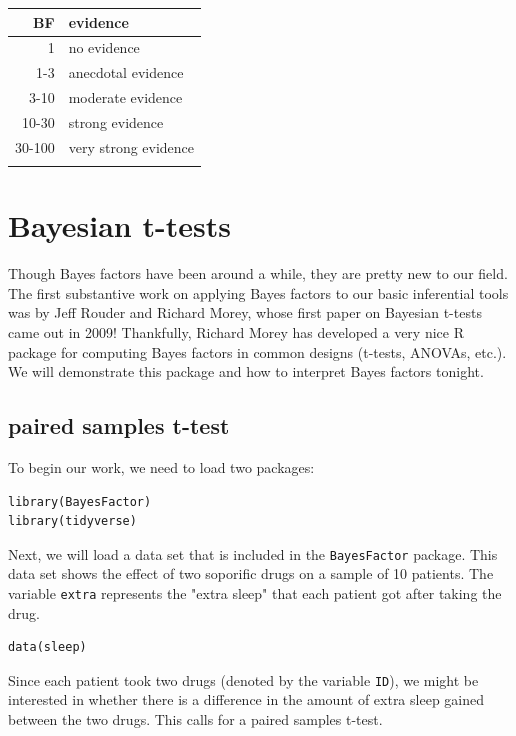 \documentclass[11pt]{article}
\begin{document}
\begin{center}
\begin{tabular}{rl}
BF & evidence\\
\hline
1 & no evidence\\
1-3 & anecdotal evidence\\
3-10 & moderate evidence\\
10-30 & strong evidence\\
30-100 & very strong evidence\\
 & \\
\end{tabular}
\end{center}

\section*{Bayesian t-tests}
\label{sec-2}

Though Bayes factors have been around a while, they are pretty new to our field.  The first substantive work on applying Bayes factors to our basic inferential tools was by Jeff Rouder and Richard Morey, whose first paper on Bayesian t-tests came out in 2009!  Thankfully, Richard Morey has developed a very nice R package for computing Bayes factors in common designs (t-tests, ANOVAs, etc.).  We will demonstrate this package and how to interpret Bayes factors tonight.

\subsection*{paired samples t-test}
\label{sec-2-1}

To begin our work, we need to load two packages:

\begin{verbatim}
library(BayesFactor)
library(tidyverse)
\end{verbatim}

Next, we will load a data set that is included in the \texttt{BayesFactor} package. This data set shows the effect of two soporific drugs on a sample of 10 patients.  The variable \texttt{extra} represents the "extra sleep" that each patient got after taking the drug.

\begin{verbatim}
data(sleep)
\end{verbatim}

Since each patient took two drugs (denoted by the variable \texttt{ID}), we might be interested in whether there is a difference in the amount of extra sleep gained between the two drugs.  This calls for a paired samples t-test.
\end{document}

